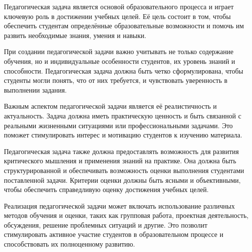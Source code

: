 
Педагогическая задача является основой образовательного процесса и играет ключевую роль в достижении учебных целей. Её цель состоит в том, чтобы обеспечить студентам определённые образовательные возможности и помочь им развить необходимые знания, умения и навыки.

При создании педагогической задачи важно учитывать не только содержание обучения, но и индивидуальные особенности студентов, их уровень знаний и способности. Педагогическая задача должна быть четко сформулирована, чтобы студенты могли понять, что от них требуется, и чувствовать уверенность в выполнении задания.

Важным аспектом педагогической задачи является её реалистичность и актуальность. Задача должна иметь практическую ценность и быть связанной с реальными жизненными ситуациями или профессиональными задачами. Это поможет стимулировать интерес и мотивацию студентов к изучению материала.

Педагогическая задача также должна предоставлять возможность для развития критического мышления и применения знаний на практике. Она должна быть структурированной и обеспечивать возможность оценки выполнения студентами поставленной задачи. Критерии оценки должны быть ясными и объективными, чтобы обеспечить справедливую оценку достижения учебных целей.

Реализация педагогической задачи может включать использование различных методов обучения и оценки, таких как групповая работа, проектная деятельность, обсуждения, решение проблемных ситуаций и другие. Это позволит стимулировать активное участие студентов в образовательном процессе и способствовать их полноценному развитию.

 